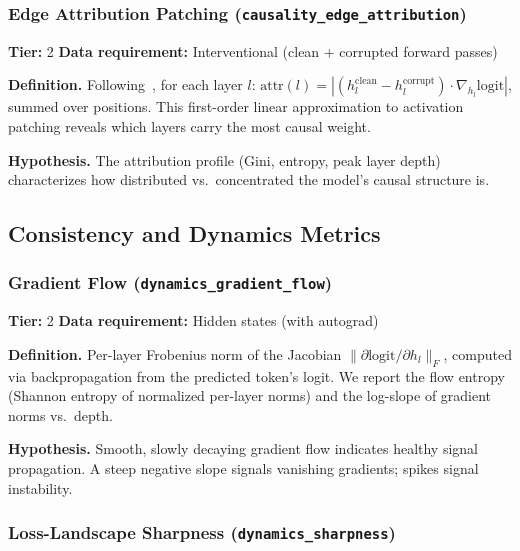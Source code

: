 \documentclass{article}
\begin{document}
\subsubsection{Edge Attribution Patching (\texttt{causality\_edge\_attribution})}
\label{app:edge-attr}

\textbf{Tier:} 2 \quad \textbf{Data requirement:} Interventional (clean + corrupted forward passes)

\textbf{Definition.} Following~\citet{syed2023attribution}, for each layer $l$: $\text{attr}(l) = |(h_l^{\text{clean}} - h_l^{\text{corrupt}}) \cdot \nabla_{h_l} \text{logit}|$, summed over positions. This first-order linear approximation to activation patching reveals which layers carry the most causal weight.

\textbf{Hypothesis.} The attribution profile (Gini, entropy, peak layer depth) characterizes how distributed vs.\ concentrated the model's causal structure is.

\subsection{Consistency and Dynamics Metrics}
\label{app:consistency-dynamics}

\subsubsection{Gradient Flow (\texttt{dynamics\_gradient\_flow})}
\label{app:gradient-flow}

\textbf{Tier:} 2 \quad \textbf{Data requirement:} Hidden states (with autograd)

\textbf{Definition.} Per-layer Frobenius norm of the Jacobian $\|\partial \text{logit} / \partial h_l\|_F$, computed via backpropagation from the predicted token's logit. We report the flow entropy (Shannon entropy of normalized per-layer norms) and the log-slope of gradient norms vs.\ depth.

\textbf{Hypothesis.} Smooth, slowly decaying gradient flow indicates healthy signal propagation. A steep negative slope signals vanishing gradients; spikes signal instability.

\subsubsection{Loss-Landscape Sharpness (\texttt{dynamics\_sharpness})}
\label{app:sharpness}
\end{document}
